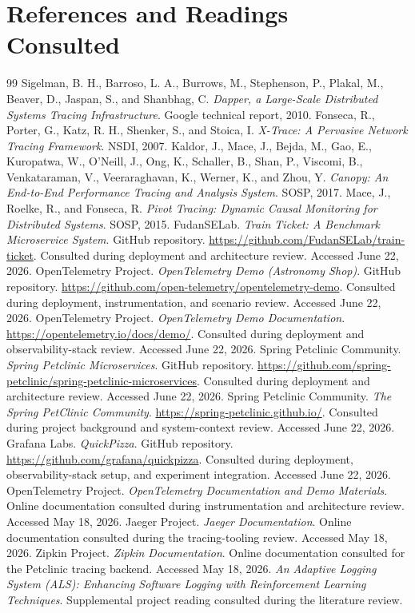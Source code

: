 \documentclass[10pt,twocolumn]{article}
\begin{document}
\section*{References and Readings Consulted}
\begin{thebibliography}{99}
 Sigelman, B. H., Barroso, L. A., Burrows, M., Stephenson, P., Plakal, M., Beaver, D., Jaspan, S., and Shanbhag, C. \emph{Dapper, a Large-Scale Distributed Systems Tracing Infrastructure}. Google technical report, 2010.
 Fonseca, R., Porter, G., Katz, R. H., Shenker, S., and Stoica, I. \emph{X-Trace: A Pervasive Network Tracing Framework}. NSDI, 2007.
 Kaldor, J., Mace, J., Bejda, M., Gao, E., Kuropatwa, W., O'Neill, J., Ong, K., Schaller, B., Shan, P., Viscomi, B., Venkataraman, V., Veeraraghavan, K., Werner, K., and Zhou, Y. \emph{Canopy: An End-to-End Performance Tracing and Analysis System}. SOSP, 2017.
 Mace, J., Roelke, R., and Fonseca, R. \emph{Pivot Tracing: Dynamic Causal Monitoring for Distributed Systems}. SOSP, 2015.
 FudanSELab. \emph{Train Ticket: A Benchmark Microservice System}. GitHub repository. \url{https://github.com/FudanSELab/train-ticket}. Consulted during deployment and architecture review. Accessed June 22, 2026.
 OpenTelemetry Project. \emph{OpenTelemetry Demo (Astronomy Shop)}. GitHub repository. \url{https://github.com/open-telemetry/opentelemetry-demo}. Consulted during deployment, instrumentation, and scenario review. Accessed June 22, 2026.
 OpenTelemetry Project. \emph{OpenTelemetry Demo Documentation}. \url{https://opentelemetry.io/docs/demo/}. Consulted during deployment and observability-stack review. Accessed June 22, 2026.
 Spring Petclinic Community. \emph{Spring Petclinic Microservices}. GitHub repository. \url{https://github.com/spring-petclinic/spring-petclinic-microservices}. Consulted during deployment and architecture review. Accessed June 22, 2026.
 Spring Petclinic Community. \emph{The Spring PetClinic Community}. \url{https://spring-petclinic.github.io/}. Consulted during project background and system-context review. Accessed June 22, 2026.
 Grafana Labs. \emph{QuickPizza}. GitHub repository. \url{https://github.com/grafana/quickpizza}. Consulted during deployment, observability-stack setup, and experiment integration. Accessed June 22, 2026.
 OpenTelemetry Project. \emph{OpenTelemetry Documentation and Demo Materials}. Online documentation consulted during instrumentation and architecture review. Accessed May 18, 2026.
 Jaeger Project. \emph{Jaeger Documentation}. Online documentation consulted during the tracing-tooling review. Accessed May 18, 2026.
 Zipkin Project. \emph{Zipkin Documentation}. Online documentation consulted for the Petclinic tracing backend. Accessed May 18, 2026.
 \emph{An Adaptive Logging System (ALS): Enhancing Software Logging with Reinforcement Learning Techniques}. Supplemental project reading consulted during the literature review.
\end{thebibliography}
\end{document}
